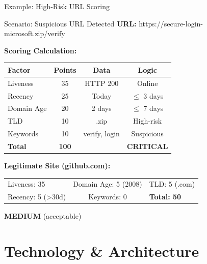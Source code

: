 \documentclass[aspectratio=169]{beamer}
\begin{document}
\begin{frame}{Example: High-Risk URL Scoring}
\small
\begin{exampleblock}{Scenario: Suspicious URL Detected}
\scriptsize
\textbf{URL:} https://secure-login-microsoft.zip/verify
\end{exampleblock}

\vspace{0.2cm}
\textbf{Scoring Calculation:}
\begin{center}
\scriptsize
\begin{tabular}{lccc}
\toprule
\textbf{Factor} & \textbf{Points} & \textbf{Data} & \textbf{Logic} \\
\midrule
Liveness & 35 & HTTP 200 & Online \\
Recency & 25 & Today & $\leq$ 3 days \\
Domain Age & 20 & 2 days & $\leq$ 7 days \\
TLD & 10 & .zip & High-risk \\
Keywords & 10 & verify, login & Suspicious \\
\midrule
\textbf{Total} & \textbf{100} & & \textcolor{criticalred}{\textbf{CRITICAL}} \\
\bottomrule
\end{tabular}
\end{center}

\vspace{0.2cm}
\textbf{Legitimate Site (github.com):}
\begin{center}
\scriptsize
\begin{tabular}{lcl}
\toprule
Liveness: 35 & Domain Age: 5 (2008) & TLD: 5 (.com) \\
Recency: 5 (>30d) & Keywords: 0 & \textbf{Total: 50} \\
\bottomrule
\end{tabular}
\textcolor{mediumyellow}{\textbf{MEDIUM}} (acceptable)
\end{center}
\end{frame}

\section{Technology \& Architecture}
\end{document}
